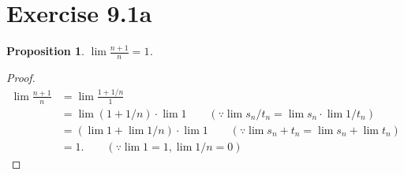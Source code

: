 \documentclass{article}
\newtheorem{proposition}[thm]{Proposition}
\begin{document}
\section*{Exercise 9.1a}
\begin{proposition}
    $\lim \frac{n+1}{n}=1$.
\end{proposition}
\begin{proof}
    \begin{align*}
        \lim \frac{n+1}{n} & = \lim \frac{1 + 1/n}{1} \\
        & = \lim (1+1/n) \cdot \lim 1 \qquad (\because\lim s_n/t_n = \lim s_n \cdot \lim 1/t_n)\\
        & = (\lim 1 + \lim 1/n)\cdot \lim 1 \qquad (\because\lim s_n + t_n = \lim s_n + \lim t_n) \\
        & = 1. \qquad (\because \lim 1 = 1, \lim 1/n = 0)
    \end{align*}
\end{proof}
\end{document}
